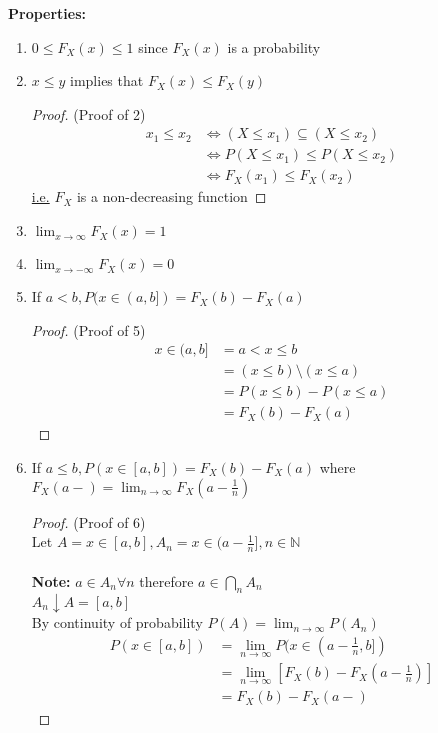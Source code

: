 \documentclass[12pt]{article}
\begin{document}
\textbf{Properties:}
\begin{enumerate}
	\item{$0 \leq F_X (x) \leq 1$ since $F_X (x)$ is a probability}
	\item{$x \leq y$ implies that $F_X (x) \leq F_X (y)$\\
	\begin{proof}(Proof of 2)\\
	\begin{align*}
		x_1 \leq x_2 & \Longleftrightarrow (X \leq x_1) \subseteq (X \leq x_2)\\
		& \Longleftrightarrow P(X \leq x_1) \leq P(X \leq x_2)\\
		& \Longleftrightarrow F_X (x_1) \leq F_X (x_2)
	\end{align*}
	\underline{i.e.} $F_X$ is a non-decreasing function
\end{proof}}
	\item{$\lim_{x\to\infty} F_X (x) = 1$}
	\item{$\lim_{x\to -\infty} F_X (x) = 0$}
	\item{If $a < b, P(x \in (a,b]) = F_X (b) - F_X (a)$\\
	\begin{proof}
		(Proof of 5)\\
		\begin{align*}
			x \in (a,b] &= a < x \leq b\\
			&= (x \leq b) \setminus (x \leq a)\\
			&= P(x \leq b) - P(x \leq a)\\
			&= F_X (b) - F_X (a)
		\end{align*}

	\end{proof}
}
	\item{
	If $a \leq b, P(x \in [a,b]) = F_X (b) - F_X (a)$ where $F_X (a-) = \lim_{n\to\infty} F_X (a-\frac{1}{n}) $\\
	\begin{proof} (Proof of 6)\\
		Let $A = x \in [a,b], A_n = x \in (a - \frac{1}{n}], n \in \mathbb{N}$\\
		\\
		\textbf{Note:} $a \in A_n \forall n$ therefore $a \in \bigcap\limits_{n} A_n $\\
		$A_n \downarrow A = [a,b]$\\
		By continuity of probability $P(A) = \lim_{n\to\infty} P(A_n)$
		\begin{align*}
			P(x\in [a,b]) &= \lim_{n\to\infty} P(x\in (a-\frac{1}{n}, b])\\
			&= \lim_{n\to\infty} [F_X (b) - F_X (a-\frac{1}{n})]\\
			&= F_X (b) - F_X (a-)
		\end{align*}
	\end{proof}

}
\end{enumerate}
\end{document}
